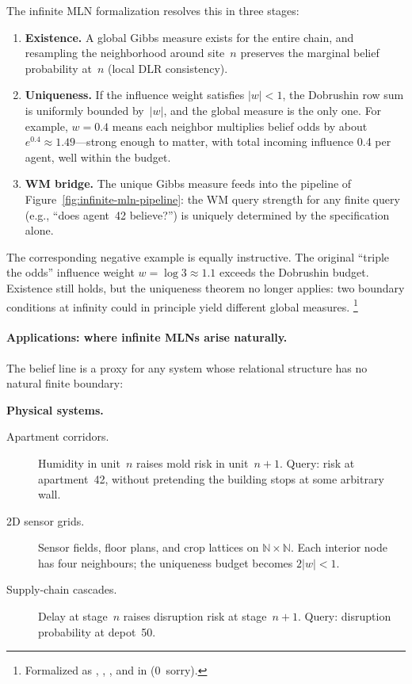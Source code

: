 \documentclass[11pt,openany]{report}
\begin{document}
The infinite MLN formalization resolves this in three stages:
\begin{enumerate}
\item \textbf{Existence.}  A global Gibbs measure exists for the entire chain,
  and resampling the neighborhood around site~$n$ preserves the marginal belief
  probability at~$n$ (local DLR consistency).
\item \textbf{Uniqueness.}  If the influence weight satisfies $|w| < 1$, the
  Dobrushin row sum is uniformly bounded by~$|w|$, and the global measure is
  the only one.  For example, $w = 0.4$ means each neighbor multiplies belief
  odds by about $e^{0.4} \approx 1.49$---strong enough to matter, with total
  incoming influence 0.4 per agent, well within the budget.
\item \textbf{WM bridge.}  The unique Gibbs measure feeds into the pipeline of
  Figure~\ref{fig:infinite-mln-pipeline}: the WM query strength for any finite
  query (e.g., ``does agent~42 believe?'') is uniquely determined by the
  specification alone.
\end{enumerate}
\noindent
The corresponding negative example is equally instructive.  The original
``triple the odds'' influence weight $w = \log 3 \approx 1.1$ exceeds the
Dobrushin budget.  Existence still holds, but the uniqueness theorem no longer
applies: two boundary conditions at infinity could in principle yield different
global measures.%
\footnote{Formalized as
,
,
, and
 in
(0~sorry).}

\paragraph{Applications: where infinite MLNs arise naturally.}
The belief line is a proxy for any system whose relational structure has no
natural finite boundary:

\smallskip\noindent\textbf{Physical systems.}
\begin{description}
\item[Apartment corridors.]  Humidity in unit~$n$ raises mold risk in
  unit~$n{+}1$.  Query: risk at apartment~42, without pretending the building
  stops at some arbitrary wall.
\item[2D sensor grids.]  Sensor fields, floor plans, and crop lattices
  on $\mathbb{N}\times\mathbb{N}$.  Each interior node has four neighbours;
  the uniqueness budget becomes $2|w|<1$.
\item[Supply-chain cascades.]  Delay at stage~$n$ raises disruption risk at
  stage~$n{+}1$.  Query: disruption probability at depot~50.
\end{description}
\end{document}
